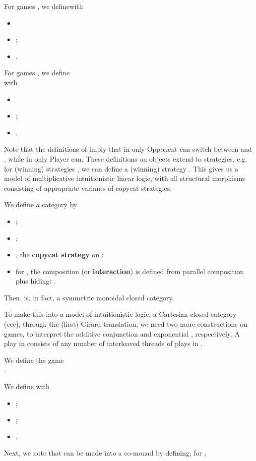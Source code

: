 \documentclass[runningheads,a4paper]{llncs}
\renewcommand{\emph}[1]{\textbf{#1}}
\begin{document}
\begin{definition}[Tensor] For games , we define\newline  with
\begin{itemize}
\item \resizebox{\linewidth}{!}{;}
\item ;
\item .
\end{itemize}
\end{definition}
\begin{definition} For games , we define\\  with
\begin{itemize}
\item \resizebox{\linewidth}{!}{;}
\item ;
\item .
\end{itemize}
\end{definition}
Note that the definitions of  imply that in  only Opponent can switch between  and , while in  only Player can. These definitions on objects extend to strategies, e.g. for (winning) strategies , we can define a (winning) strategy . This gives us a model of multiplicative intuitionistic linear logic, with all structural morphisms consisting of appropriate variants of copycat strategies.
\begin{theorem} We define a category  by\vspace{-6pt}
\begin{itemize}
\item ;
\item ;
\item , the \emph{copycat strategy} on ;
\item for , the composition (or \emph{interaction})  is defined from parallel composition  plus hiding: .
\end{itemize}
Then,  is, in fact, a symmetric monoidal closed category.
\end{theorem}
To make this into a model of intuitionistic logic, a Cartesian closed category (ccc), through the (first) Girard translation, we need two more constructions on games, to interpret the additive conjunction  and exponential , respectively. A play in  consists of any number of interleaved threads of plays in .
\begin{definition}[With] We define the game\\ .
\end{definition}
\begin{definition}[Bang] We define  with\vspace{-3pt}
\begin{itemize}
\item ; \item ;
\item .
\end{itemize}
\end{definition}
Next, we note that  can be made into a co-monad by defining, for , \vspace{-3pt}
\end{document}

